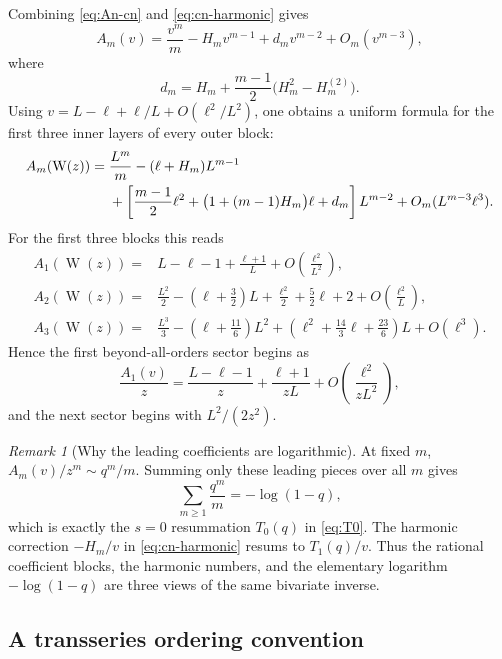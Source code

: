 \documentclass[11pt,oneside]{article}
\theoremstyle{plain}
\theoremstyle{definition}
\theoremstyle{remark}
\newtheorem{remark}[theorem]{Remark}
\newcommand{\W}{\operatorname{W}}
\begin{document}
Combining \eqref{eq:An-cn} and \eqref{eq:cn-harmonic} gives
\begin{equation}
 A_m(v)=\frac{v^m}{m}-H_m v^{m-1}
 +d_m v^{m-2}+O_m(v^{m-3}),
 \label{eq:Am-v-large}
\end{equation}
where
\begin{equation}
 d_m=H_m+\frac{m-1}{2}\bigl(H_m^2-H_m^{(2)}\bigr).
 \label{eq:dm-def}
\end{equation}
Using
\(v=L-\ell+\ell/L+O(\ell^2/L^2)\), one obtains a uniform formula for the
first three inner layers of every outer block:
\begin{align}
 A_m(\W(z))={}&\frac{L^m}{m}-(\ell+H_m)L^{m-1}\notag\\
 &+\left[
 \frac{m-1}{2}\ell^2+\bigl(1+(m-1)H_m\bigr)\ell+d_m
 \right]L^{m-2}
 +O_m(L^{m-3}\ell^3).
 \label{eq:Am-log-inner}
\end{align}
For the first three blocks this reads
\begin{align}
 A_1(\W(z))={}&L-\ell-1+\frac{\ell+1}{L}
 +O\!\left(\frac{\ell^2}{L^2}\right),
 \label{eq:A1-log}\\
 A_2(\W(z))={}&\frac{L^2}{2}-\left(\ell+\frac32\right)L
 +\frac{\ell^2}{2}+\frac52\ell+2
 +O\!\left(\frac{\ell^2}{L}\right),
 \label{eq:A2-log}\\
 A_3(\W(z))={}&\frac{L^3}{3}-\left(\ell+\frac{11}{6}\right)L^2
 +\left(\ell^2+\frac{14}{3}\ell+\frac{23}{6}\right)L
 +O(\ell^3).
 \label{eq:A3-log}
\end{align}
Hence the first beyond-all-orders sector begins as
\begin{equation}
 \frac{A_1(v)}{z}
 =\frac{L-\ell-1}{z}
 +\frac{\ell+1}{zL}
 +O\!\left(\frac{\ell^2}{zL^2}\right),
 \label{eq:first-exponential-sector}
\end{equation}
and the next sector begins with \(L^2/(2z^2)\).

\begin{remark}[Why the leading coefficients are logarithmic]
At fixed \(m\), \(A_m(v)/z^m\sim q^m/m\).  Summing only these leading pieces
over all \(m\) gives
\[
 \sum_{m\ge1}\frac{q^m}{m}=-\log(1-q),
\]
which is exactly the \(s=0\) resummation \(T_0(q)\) in
\eqref{eq:T0}.  The harmonic correction \(-H_m/v\) in \eqref{eq:cn-harmonic}
resums to \(T_1(q)/v\).  Thus the rational coefficient blocks, the harmonic
numbers, and the elementary logarithm \(-\log(1-q)\) are three views of the
same bivariate inverse.
\end{remark}

\subsection{A transseries ordering convention}
\end{document}
